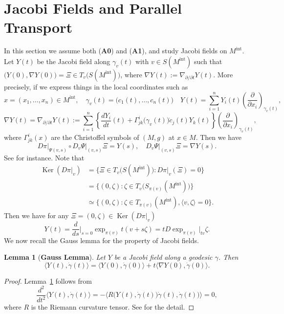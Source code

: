 \documentclass[a4paper,11pt,reqno]{amsart}
\numberwithin{equation}{section}
\newtheorem{lemma}[theorem]{Lemma}
\theoremstyle{definition}
\theoremstyle{remark}
\begin{document}
\section{Jacobi Fields and Parallel Transport}
\label{section:jacobifields}
In this section we assume both ({\bf A0}) and ({\bf A1}), 
and study Jacobi fields on $M^\text{int}$. 
Let $Y(t)$ be the Jacobi field along $\gamma_v(t)$ with $v \in S(M^\text{int})$ 
such that 
$\bigl(Y(0),\nabla{Y(0)}\bigr)=\Xi \in T_v\bigl(S(M^\text{int})\bigr)$, 
where $\nabla{Y}(t):=\nabla_{\partial/\partial{t}}Y(t)$. 
More precisely, if we express things in the local coordinates such as 
%
%
$$
x=(x_1,\dotsc,x_n) \in M^\text{int}, 
\quad
\gamma_v(t)=\bigl(c_1(t),\dotsc,c_n(t)\bigr)
\quad
Y(t)
=
\sum_{i=1}^n
Y_i(t)
\left(\frac{\partial}{\partial x_i}\right)_{\gamma_v(t)},
$$
%
%
$$
\nabla{Y}(t)
=
\nabla_{\partial/\partial{t}}Y(t)
:=
\sum_{i=1}^n
\left\{
\frac{dY_i}{dt}(t)
+
\Gamma^i_{jk}\bigl(\gamma_v(t)\bigr)\dot{c}_j(t)Y_k(t)
\right\}
\left(\frac{\partial}{\partial x_i}\right)_{\gamma_v(t)}, 
$$
%
%
where $\Gamma^i_{jk}(x)$ are the Christoffel symbols of $(M,g)$ at $x \in M$. 
Then we have 
%
%
$$
D\pi\vert_{\Psi(v,s)}{\circ}D_v\Psi\vert_{(v,s)}\Xi=Y(s), 
\quad
D_v\Psi\vert_{(v,s)}\Xi=\nabla{Y(s)}. 
$$
%
%
See \cite[Lemma~4.3 in Page~56]{Sakai} for instance. 
Note that 
%
%
\begin{align*}
  \operatorname{Ker}(D\pi\vert_v)
& =
  \bigl\{
  \Xi \in T_v\bigl(S(M^\text{int})\bigr): 
  D\pi\vert_v(\Xi)=0
  \bigr\}
\\
& =
  \bigl\{(0,\zeta): \zeta \in T_v\bigl(S_{\pi(v)}(M^\text{int})\bigr)\bigr\}
\\
& \simeq
  \{(0,\zeta): \zeta \in T_{\pi(v)}(M^\text{int}), \langle{v,\zeta}\rangle=0\}. 
\end{align*}
%
%
Then we have for any $\Xi=(0,\zeta) \in \operatorname{Ker}(D\pi\vert_v)$ 
%
%
$$
Y(t)
=
\frac{d}{ds}\bigg\vert_{s=0}\exp_{\pi(v)}t(v+s\zeta)
=
tD\exp_{\pi(v)}\Big\vert_{tv}\zeta. 
$$
%
%
We now recall the Gauss lemma for the property of Jacobi fields.  
%
%
\begin{lemma}[{\bf Gauss Lemma}]
\label{theorem:gauss}
Let $Y$ be a Jacobi field along a geodesic $\gamma$. Then 
%
%
$$
\langle{Y(t),\dot{\gamma}(t)\rangle}
=
\langle{Y(0),\dot{\gamma}(0)\rangle}
+
t
\langle{{\nabla}Y(0),\dot{\gamma}(0)\rangle}.
$$
%
% 
\end{lemma}
%
%
\begin{proof} 
Lemma~\ref{theorem:gauss} follows from 
%
%
$$
\frac{d^2}{dt^2}
\langle{Y(t),\dot{\gamma}(t)\rangle}
=
-
\bigl\langle
R\bigl(Y(t),\dot{\gamma}(t)\bigr)\dot{\gamma}(t),\dot{\gamma}(t)\bigr)
\bigr\rangle
=
0,
$$
%
%
where $R$ is the Riemann curvature tensor. 
See \cite[Proposition~2.3 in Page 36]{Sakai} for the detail. 
\end{proof}
\end{document}
